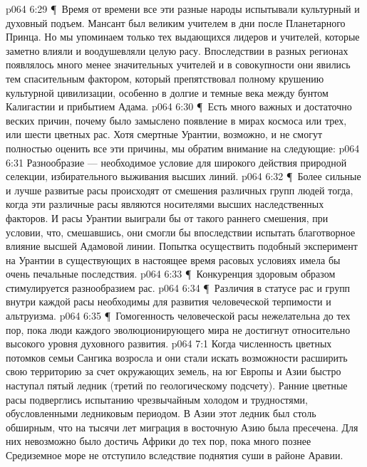 \vs p064 6:29 \P\ Время от времени все эти разные народы испытывали культурный и духовный подъем. Мансант был великим учителем в дни после Планетарного Принца. Но мы упоминаем только тех выдающихся лидеров и учителей, которые заметно влияли и воодушевляли целую расу. Впоследствии в разных регионах появлялось много менее значительных учителей и в совокупности они явились тем спасительным фактором, который препятствовал полному крушению культурной цивилизации, особенно в долгие и темные века между бунтом Калигастии и прибытием Адама.
\vs p064 6:30 \P\ Есть много важных и достаточно веских причин, почему было замыслено появление в мирах космоса или трех, или шести цветных рас. Хотя смертные Урантии, возможно, и не смогут полностью оценить все эти причины, мы обратим внимание на следующие:
\vs p064 6:31 \bibnobreakspace Разнообразие --- необходимое условие для широкого действия природной селекции, избирательного выживания высших линий.
\vs p064 6:32 \P\ \bibnobreakspace Более сильные и лучше развитые расы происходят от смешения различных групп людей тогда, когда эти различные расы являются носителями высших наследственных факторов. И расы Урантии выиграли бы от такого раннего смешения, при условии, что, смешавшись, они смогли бы впоследствии испытать благотворное влияние высшей Адамовой линии. Попытка осуществить подобный эксперимент на Урантии в существующих в настоящее время расовых условиях имела бы очень печальные последствия.
\vs p064 6:33 \P\ \bibnobreakspace Конкуренция здоровым образом стимулируется разнообразием рас.
\vs p064 6:34 \P\ \bibnobreakspace Различия в статусе рас и групп внутри каждой расы необходимы для развития человеческой терпимости и альтруизма.
\vs p064 6:35 \P\ \bibnobreakspace Гомогенность человеческой расы нежелательна до тех пор, пока люди каждого эволюционирующего мира не достигнут относительно высокого уровня духовного развития.
\vs p064 7:1 Когда численность цветных потомков семьи Сангика возросла и они стали искать возможности расширить свою территорию за счет окружающих земель, на юг Европы и Азии быстро наступал пятый ледник (третий по геологическому подсчету). Ранние цветные расы подверглись испытанию чрезвычайным холодом и трудностями, обусловленными ледниковым периодом. В Азии этот ледник был столь обширным, что на тысячи лет миграция в восточную Азию была пресечена. Для них невозможно было достичь Африки до тех пор, пока много познее Средиземное море не отступило вследствие поднятия суши в районе Аравии.
